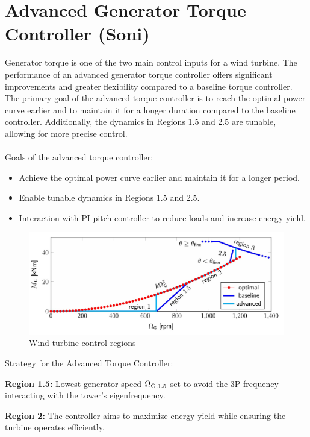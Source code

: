 \section{Advanced Generator Torque Controller (Soni)} \label{Torque controller}
Generator torque is one of the two main control inputs for a wind turbine.
The performance of an advanced generator torque controller offers significant improvements and greater flexibility compared to a baseline torque controller.
The primary goal of the advanced torque controller is to reach the optimal power curve earlier and to maintain it for a longer duration compared to the baseline controller.
Additionally, the dynamics in Regions 1.5 and 2.5 are tunable, allowing for more precise control.
\\
\\
Goals of the advanced torque controller:
\begin{itemize}
	\item Achieve the optimal power curve earlier and maintain it for a longer period.
	\item Enable tunable dynamics in Regions 1.5 and 2.5.
	\item Interaction with PI-pitch controller to reduce loads and increase energy yield.
\end{itemize}

\begin{figure}[htbp]
	\centering
	\includegraphics[width=\textwidth]{Figures/Figure_3.jpg}
	\caption{Wind turbine control regions \cite{SchlipfLecture}} 
	\label{WT control region}
\end{figure}

Strategy for the Advanced Torque Controller:

\textbf{Region 1.5:} Lowest generator speed $\Omega_{\textnormal{G,1.5}}$ set to avoid the 3P frequency interacting with the tower's eigenfrequency.

\textbf{Region 2:} The controller aims to maximize energy yield while ensuring the turbine operates efficiently.

